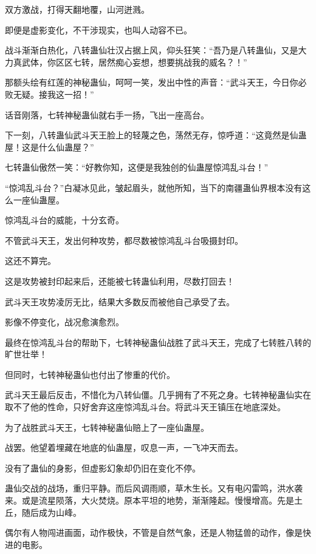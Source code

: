 
\begin{this_body}

双方激战，打得天翻地覆，山河迸溅。

即便是虚影变化，不干涉现实，也叫人动容不已。

战斗渐渐白热化，八转蛊仙壮汉占据上风，仰头狂笑：“吾乃是八转蛊仙，又是大力真武体，你区区七转，居然痴心妄想，想要挑战我的威名？！”

那额头绘有红莲的神秘蛊仙，呵呵一笑，发出中性的声音：“武斗天王，今日你必败无疑。接我这一招！”

话音刚落，七转神秘蛊仙就右手一扬，飞出一座高台。

下一刻，八转蛊仙武斗天王脸上的轻蔑之色，荡然无存，惊呼道：“这竟然是仙蛊屋！这是什么仙蛊屋？”

七转蛊仙傲然一笑：“好教你知，这便是我独创的仙蛊屋惊鸿乱斗台！”

“惊鸿乱斗台？”白凝冰见此，皱起眉头，就他所知，当下的南疆蛊仙界根本没有这么一座仙蛊屋。

惊鸿乱斗台的威能，十分玄奇。

不管武斗天王，发出何种攻势，都尽数被惊鸿乱斗台吸摄封印。

这还不算完。

这是攻势被封印起来后，还能被七转蛊仙利用，尽数打回去！

武斗天王攻势凌厉无比，结果大多数反而被他自己承受了去。

影像不停变化，战况愈演愈烈。

最终在惊鸿乱斗台的帮助下，七转神秘蛊仙战胜了武斗天王，完成了七转胜八转的旷世壮举！

但同时，七转神秘蛊仙也付出了惨重的代价。

武斗天王最后反击，不惜化为八转仙僵。几乎拥有了不死之身。七转神秘蛊仙实在取不了他的性命，只好舍弃这座惊鸿乱斗台。将武斗天王镇压在地底深处。

为了战胜武斗天王，七转神秘蛊仙赔上了一座仙蛊屋。

战罢。他望着埋藏在地底的仙蛊屋，叹息一声，一飞冲天而去。

没有了蛊仙的身影，但虚影幻象却仍旧在变化不停。

蛊仙交战的战场，重归平静。而后风调雨顺，草木生长。又有电闪雷鸣，洪水袭来。或是流星陨落，大火焚烧。原本平坦的地势，渐渐隆起。慢慢增高。先是土丘，随后成为山峰。

偶尔有人物闯进画面，动作极快，不管是自然气象，还是人物猛兽的动作，像是快进的电影。


\end{this_body}
